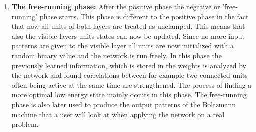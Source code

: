 \documentclass[12pt,twoside]{article}
\theoremstyle{plain}
\theoremstyle{definition}
\theoremstyle{remark}
\begin{document}
\begin{enumerate}
    \item \textbf{The free-running phase:}\newline
        After the positive phase the negative or 'free-running' phase starts. This phase is different to the positive phase in the fact that
        now all units of both layers are treated as unclamped. This means that also the visible layers units states can now be updated.
        Since no more input patterns are given to the visible layer all units are now initialized with a random binary value and
        the network is run freely. In this phase the previously learned information, which is stored in the weights 
        is analyzed by the network and found correlations between for example two connected units often being active at the
        same time are strengthened. The process of finding a more optimal low energy state mainly occurs in this phase.\newline
        The free-running phase is also later used to produce the output patterns of the Boltzmann machine that a user will
        look at when applying the network on a real problem.


\end{enumerate}
\end{document}

